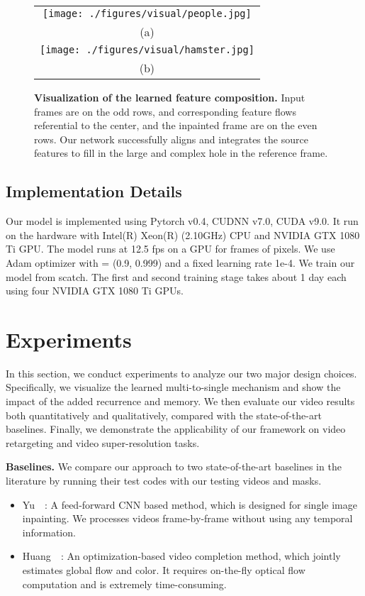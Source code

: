 \documentclass[10pt,twocolumn,letterpaper]{article}
\renewcommand{\paragraph}[1]{\vspace{1mm}\noindent\textbf{#1}}
\begin{document}
\begin{figure}[t]
\def\arraystretch{1.0}
\begin{tabular}{c@{}}
    \texttt{[image: ./figures/visual/people.jpg]} \\
    (a) \\
    \texttt{[image: ./figures/visual/hamster.jpg]}\\
    (b) \\
\end{tabular}
\caption{\textbf{Visualization of the learned feature composition.} Input frames are on the odd rows, and corresponding feature flows referential to the center, and the inpainted frame are on the even rows. Our network successfully aligns and integrates the source features to fill in the large and complex hole in the reference frame.}
\label{fig:vis_feature_comp}
\end{figure}

\subsection{Implementation Details}
Our model is implemented using Pytorch v0.4, CUDNN v7.0, CUDA v9.0. It run on the hardware with Intel(R) Xeon(R) (2.10GHz) CPU and NVIDIA GTX 1080 Ti GPU. The model runs at 12.5 fps on a GPU for frames of  pixels. We use Adam optimizer with  = (0.9, 0.999) and a fixed learning rate 1e-4. We train our model from scatch. The first and second training stage takes about 1 day each using four NVIDIA GTX 1080 Ti GPUs.



\section{Experiments}
\label{sec:experiments}
In this section, we conduct experiments to analyze our two major design choices. Specifically, we visualize the learned multi-to-single mechanism and show the impact of the added recurrence and memory. We then evaluate our video results both quantitatively and qualitatively, compared with the state-of-the-art baselines. Finally, we demonstrate the applicability of our framework on video retargeting and video super-resolution tasks. 

\paragraph{Baselines.} We compare our approach to two state-of-the-art baselines in the literature by running their test codes with our testing videos and masks.
\begin{itemize}[topsep=1pt,itemsep=1pt]
\item Yu~\etal~\cite{yu2018generative}: A feed-forward CNN based method, which is designed for single image inpainting. We processes videos frame-by-frame without using any temporal information.
\item Huang~\etal~\cite{huang2016temporally}: An optimization-based video completion method, which jointly estimates global flow and color. It requires on-the-fly optical flow computation and is extremely time-consuming.
\end{itemize}
\end{document}
